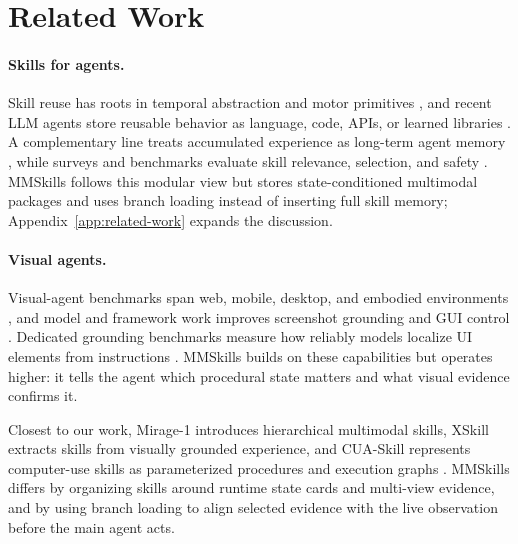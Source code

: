 
\section{Related Work}
\label{sec:related-work}

\paragraph{Skills for agents.}
Skill reuse has roots in temporal abstraction and motor primitives \citep{sutton1999options,ijspeert2013dmp}, and recent LLM agents store reusable behavior as language, code, APIs, or learned libraries \citep{ichter2022saycan,liang2023codepolicies,yao2023react,shinn2023reflexion,wang2023voyager,zheng2025skillweaver,chen2026cuaskill,wang2026skillx,alzubi2026evoskill,ma2026skillclawletskillsevolve,xia2026skillrlevolvingagentsrecursive}. A complementary line treats accumulated experience as long-term agent memory \citep{park2023generativeagentsinteractivesimulacra,packer2024memgptllmsoperatingsystems}, while surveys and benchmarks evaluate skill relevance, selection, and safety \citep{xu2026agentskills,li2026skillsbenchbenchmarkingagentskills,wang2026skilltesterbenchmarkingutilitysecurity,liu2026agenticskillsworkwild}. MMSkills follows this modular view but stores state-conditioned multimodal packages and uses branch loading instead of inserting full skill memory; Appendix~\ref{app:related-work} expands the discussion.

\paragraph{Visual agents.}
Visual-agent benchmarks span web, mobile, desktop, and embodied environments \citep{deng2023mind2web,zhou2024webarena,koh2024visualwebarena,he2024webvoyager,rawles2025androidworld,xie2024osworld,yang2025macosworld,liu2024visualagentbench}, and model and framework work improves screenshot grounding and GUI control \citep{cheng2024seeclick,wu2024osatlas,qin2025uitars,agashe2024agents,hong2024cogagentvisuallanguagemodel,zheng2024gpt4visiongeneralistwebagent,zhang2023appagentmultimodalagentssmartphone,lu2024omniparserpurevisionbased}. Dedicated grounding benchmarks measure how reliably models localize UI elements from instructions \citep{li2025screenspotproguigroundingprofessional,gou2025navigatingdigitalworldhumans,wang2025mmbenchguihierarchicalmultiplatformevaluation,xu2025deskvisionlargescaledesktop}. MMSkills builds on these capabilities but operates higher: it tells the agent which procedural state matters and what visual evidence confirms it.

Closest to our work, Mirage-1 introduces hierarchical multimodal skills, XSkill extracts skills from visually grounded experience, and CUA-Skill represents computer-use skills as parameterized procedures and execution graphs \citep{xie2025mirage,jiang2026xskillcontinuallearningexperience,chen2026cuaskill}. MMSkills differs by organizing skills around runtime state cards and multi-view evidence, and by using branch loading to align selected evidence with the live observation before the main agent acts.
